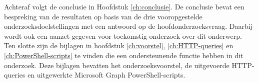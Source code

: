 Achteraf volgt de conclusie in Hoofdstuk \ref{ch:conclusie}. De conclusie bevat een bespreking van de resultaten op basis van de drie vooropgestelde onderzoeksdoelstellingen met een antwoord op de hoofdonderzoeksvraag. Daarbij wordt ook een aanzet gegeven voor toekomstig onderzoek over dit onderwerp. \\

Ten slotte zijn de bijlagen in hoofdstuk \ref{ch:voorstel}, \ref{ch:HTTP-queries} en \ref{ch:PowerShell-scripts} te vinden die een ondersteunende functie hebben in dit onderzoek. Deze bijlagen bevatten het onderzoeksvoorstel, de uitgevoerde \Ac{HTTP}-queries en uitgewerkte Microsoft Graph PowerShell-scripts.

\begin{comment}

De rest van deze bachelorproef is als volgt opgebouwd:

In Hoofdstuk~\ref{ch:stand-van-zaken} wordt een overzicht gegeven van de stand van zaken binnen het onderzoeksdomein, op basis van een literatuurstudie.

In Hoofdstuk~\ref{ch:methodologie} wordt de methodologie toegelicht en worden de gebruikte onderzoekstechnieken besproken om een antwoord te kunnen formuleren op de onderzoeksvragen.


In Hoofdstuk~\ref{ch:conclusie}, tenslotte, wordt de conclusie gegeven en een antwoord geformuleerd op de onderzoeksvragen. Daarbij wordt ook een aanzet gegeven voor toekomstig onderzoek binnen dit domein.
\end{comment}
